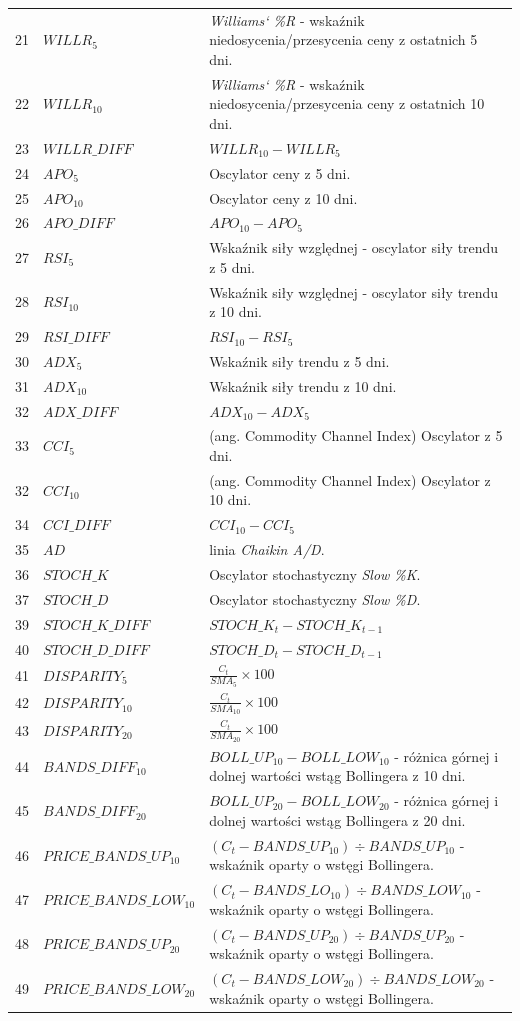 \documentclass[a4paper, twoside, 11pt, openright]{article}
\begin{document}
\begin{longtable}[c]{| m{0.5cm} m{5cm} m{10cm}|}
  21 & $WILLR_{5}$ & \textit{Williams` \%R} - wskaźnik niedosycenia/przesycenia ceny z ostatnich 5 dni. \\
 22 & $WILLR_{10}$ & \textit{Williams` \%R} - wskaźnik niedosycenia/przesycenia ceny z ostatnich 10 dni.  \\
 23 & $WILLR\_DIFF$ & $WILLR_{10}-WILLR_{5}$ \\
  24 & $APO_{5}$ & Oscylator ceny z 5 dni. \\
 25 & $APO_{10}$ & Oscylator ceny z 10 dni.  \\
 26 & $APO\_DIFF$ & $APO_{10}-APO_{5}$ \\
  27 & $RSI_{5}$ & Wskaźnik siły względnej - oscylator siły trendu z 5 dni. \\
 28 & $RSI_{10}$ & Wskaźnik siły względnej - oscylator siły trendu z 10 dni.\\
 29 & $RSI\_DIFF$ & $RSI_{10}-RSI_{5}$ \\
  30 & $ADX_{5}$ & Wskaźnik siły trendu z 5 dni. \\
 31 & $ADX_{10}$ & Wskaźnik siły trendu z 10 dni. \\
 32 & $ADX\_DIFF$ & $ADX_{10}-ADX_{5}$ \\
 33 & $CCI_{5}$ & (ang. Commodity Channel Index) Oscylator z 5 dni. \\
 32 & $CCI_{10}$ & (ang. Commodity Channel Index) Oscylator z 10 dni. \\
 34 & $CCI\_DIFF$ & $CCI_{10}-CCI_{5}$ \\
 35 & $AD$ & linia \textit{Chaikin A/D}.  \\
 36 & $STOCH\_K$ & Oscylator stochastyczny \textit{Slow \%K}. \\
 37 & $STOCH\_D$ & Oscylator stochastyczny \textit{Slow \%D}.\\
 39 & $STOCH\_K\_DIFF$ & $STOCH\_K_{t}-STOCH\_K_{t-1}$ \\
 40 & $STOCH\_D\_DIFF$ & $STOCH\_D_{t}-STOCH\_D_{t-1}$  \\
 41 & $DISPARITY_{5}$ &  $\frac{C_t}{SMA_5}\times 100$ \\
 42 & $DISPARITY_{10}$ & $\frac{C_t}{SMA_10}\times 100$ \\
 43 & $DISPARITY_{20}$ & $\frac{C_t}{SMA_20}\times 100$ \\
 44 & $BANDS\_DIFF_{10}$ & $BOLL\_UP_{10} - BOLL\_LOW_{10}$ - różnica górnej i dolnej wartości wstąg Bollingera z 10 dni.  \\
 45 & $BANDS\_DIFF_{20}$ & $BOLL\_UP_{20} - BOLL\_LOW_{20}$ - różnica górnej i dolnej wartości wstąg Bollingera z 20 dni.  \\
46 & $PRICE\_BANDS\_UP_{10}$ & $(C_t-BANDS\_UP_{10})\div BANDS\_UP_{10}$ - wskaźnik oparty o wstęgi Bollingera.  \\
 47 & $PRICE\_BANDS\_LOW_{10}$ & $(C_t-BANDS\_LO_{10})\div BANDS\_LOW_{10}$ - wskaźnik oparty o wstęgi Bollingera.\\
 48 & $PRICE\_BANDS\_UP_{20}$ & $(C_t-BANDS\_UP_{20})\div BANDS\_UP_{20}$ - wskaźnik oparty o wstęgi Bollingera.\\
 49 & $PRICE\_BANDS\_LOW_{20}$ & $(C_t-BANDS\_LOW_{20})\div BANDS\_LOW_{20}$ - wskaźnik oparty o wstęgi Bollingera.\\
     

\end{longtable}
\end{document}
